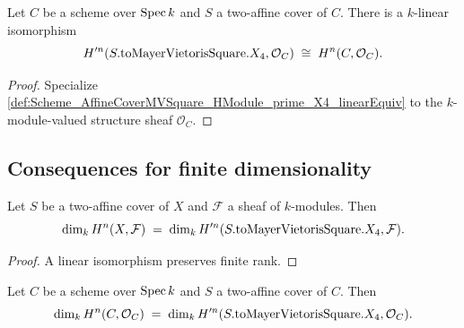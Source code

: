 \begin{definition}\leanok
  \label{def:Scheme_AffineCoverMVSquare_HModule_prime_X4_linearEquiv_curve}

  Let \(C\) be a scheme over \(\operatorname{Spec} k\) and \(S\) a two-affine cover of \(C\). There is a \(k\)-linear isomorphism
  \[
    H^{\prime n}(S.\mathrm{toMayerVietorisSquare}.X_4, \mathcal O_C) \;\cong\; H^{n}(C, \mathcal O_C).
  \]
\end{definition}

\begin{proof}


\leanok
  Specialize \cref{def:Scheme_AffineCoverMVSquare_HModule_prime_X4_linearEquiv} to the \(k\)-module-valued structure sheaf \(\mathcal O_C\).
\end{proof}

\subsection{Consequences for finite dimensionality}

\begin{theorem}\leanok
  \label{thm:Scheme_AffineCoverMVSquare_finrank_HModule_eq_HModule_prime_X4}

  Let \(S\) be a two-affine cover of \(X\) and \(\mathcal F\) a sheaf of \(k\)-modules. Then
  \[
    \dim_k H^{n}(X, \mathcal F) \;=\; \dim_k H^{\prime n}(S.\mathrm{toMayerVietorisSquare}.X_4, \mathcal F).
  \]
\end{theorem}

\begin{proof}


\leanok
  A linear isomorphism preserves finite rank.
\end{proof}

\begin{theorem}\leanok
  \label{thm:Scheme_AffineCoverMVSquare_finrank_HModule_eq_HModule_prime_X4_curve}

  Let \(C\) be a scheme over \(\operatorname{Spec} k\) and \(S\) a two-affine cover of \(C\). Then
  \[
    \dim_k H^{n}(C, \mathcal O_C) \;=\; \dim_k H^{\prime n}(S.\mathrm{toMayerVietorisSquare}.X_4, \mathcal O_C).
  \]
\end{theorem}

